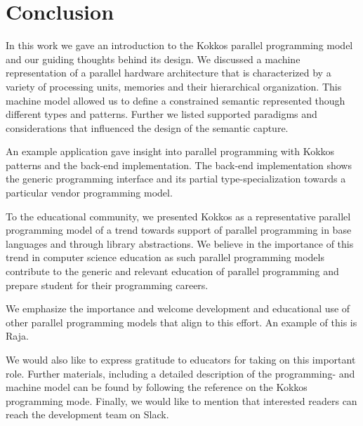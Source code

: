 \section{Conclusion}\label{chap:conclusion}
In this work we gave an introduction to the Kokkos parallel programming model and our guiding thoughts behind its design. We discussed a machine representation of a parallel hardware architecture that is characterized by a variety of processing units, memories and their hierarchical organization. This machine model allowed us to define a constrained semantic represented though different types and patterns. Further we listed supported paradigms and considerations that influenced the design of the semantic capture.

An example application gave insight into parallel programming with Kokkos patterns and the back-end implementation. The back-end implementation shows the generic programming interface and its partial type-specialization towards a particular vendor programming model.

To the educational community, we presented Kokkos as a representative parallel programming model of a trend towards support of parallel programming in base languages and through library abstractions. We believe in the importance of this trend in computer science education as such parallel programming models contribute to the generic and relevant education of parallel programming and prepare student for their programming careers.

We emphasize the importance and welcome development and educational use of other parallel programming models that align to this effort. An example of this is Raja. 

We would also like to express gratitude to educators for taking on this important role. Further materials, including a detailed description of the programming- and machine model can be found by following the reference on the Kokkos programming mode. Finally, we would like to mention that interested readers can reach the development team on Slack\cite{KOKKOS_SLACK}.
